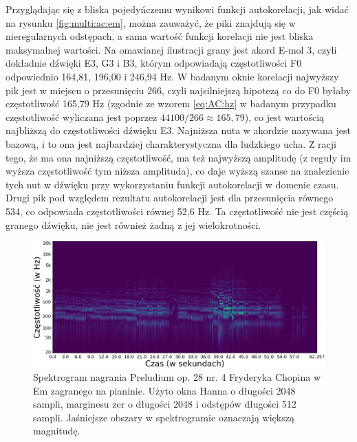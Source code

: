 \documentclass[12pt,a4paper,twoside]{mwart}
\begin{document}
Przyglądając się z bliska pojedyńczemu wynikowi funkcji autokorelacji, jak widać na rysunku \ref{fig:multi:ac:em}, można zauważyć, że piki znajdują się w nieregularnych odstępach, a sama wartość funkcji korelacji nie jest bliska maksymalnej wartości. Na omawianej ilustracji grany jest akord E-mol 3, czyli dokładnie dźwięki E3, G3 i B3, którym odpowiadają częstotliwości F0 odpowiednio 164,81, 196,00 i 246,94 Hz. W badanym oknie korelacji najwyższy pik jest w miejscu o przesunięciu 266, czyli najsilniejszą hipotezą co do F0 byłaby częstotliwość 165,79 Hz (zgodnie ze wzorem \ref{eq:AC:hz} w badanym przypadku częstotliwość wyliczana jest poprzez $44100 / 266 \approx 165,79$), co jest wartością najbliższą do częstotliwości dźwięku E3. Najniższa nuta w akordzie nazywana jest bazową, i to ona jest najbardziej charakterystyczna dla ludzkiego ucha. Z racji tego, że ma ona najniższą częstotliwość, ma też najwyższą amplitudę (z reguły im wyższa częstotliwość tym niższa amplituda), co daje wyższą szanse na znalezienie tych nut w dźwięku przy wykorzystaniu funkcji autokorelacji w domenie czasu. Drugi pik pod względem rezultatu autokorelacji jest dla przesunięcia równego 534, co odpowiada częstotliwości równej 52,6 Hz. Ta częstotliwość nie jest częścią granego dźwięku, nie jest również żadną z jej wielokrotności.

\begin{figure}[ht]
  \begin{center}
    \includegraphics[scale=0.38]{images/Spectrogram/spectrogram_multi_2048_512_cropped.png}
    \caption{Spektrogram nagrania Preludium op. 28 nr. 4 Fryderyka Chopina w Em zagranego na pianinie. Użyto okna Hanna o długości 2048 sampli, marginesu zer o długości 2048 i odstępów długości 512 sampli. Jaśniejsze obszary w spektrogramie oznaczają większą magnitudę.}
    \label{fig:multi:spectrogram}
  \end{center}
\end{figure}
\end{document}
